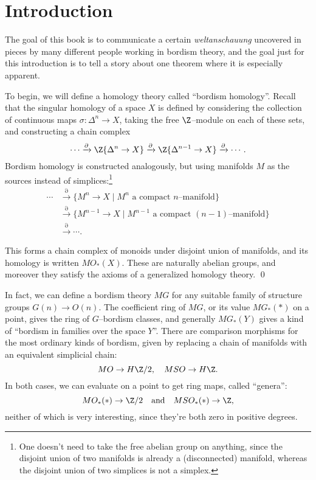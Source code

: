 
\setcounter{chapter}{-1}
\chapter{Introduction}

\label{IntroductionSection}

The goal of this book is to communicate a certain \textit{weltanschauung} uncovered in pieces by many different people working in bordism theory, and the goal just for this introduction is to tell a story about one theorem where it is especially apparent.

To begin, we will define a homology theory called ``bordism homology''.  Recall that the singular homology of a space $X$ is defined by considering the collection of continuous maps $\sigma: \Delta^n \to X$, taking the free $\Z$--module on each of these sets, and constructing a chain complex \[\cdots \xrightarrow{\partial} \Z\{\Delta^n \to X\} \xrightarrow{\partial} \Z\{\Delta^{n-1} \to X\} \xrightarrow{\partial} \cdots.\]  Bordism homology is constructed analogously, but using manifolds $M$ as the sources instead of simplices:\footnote{One doesn't need to take the free abelian group on anything, since the disjoint union of two manifolds is already a (disconnected) manifold, whereas the disjoint union of two simplices is not a simplex.}
\begin{align*}
\cdots & \xrightarrow{\partial} \{M^n \to X \mid \text{$M^n$ a compact $n$--manifold}\} \\
& \xrightarrow{\partial} \{M^{n-1} \to X \mid \text{$M^{n-1}$ a compact $(n-1)$--manifold}\} \\
& \xrightarrow{\partial} \cdots.
\end{align*}

\begin{lemma}
This forms a chain complex of monoids under disjoint union of manifolds, and its homology is written $MO_*(X)$.  These are naturally abelian groups, and moreover they satisfy the axioms of a generalized homology theory. \qed
\end{lemma}

In fact, we can define a bordism theory $MG$ for any suitable family of structure groups $G(n) \to O(n)$.  The coefficient ring of $MG$, or its value $MG_*(*)$ on a point, gives the ring of $G$--bordism classes, and generally $MG_*(Y)$ gives a kind of ``bordism in families over the space $Y$''.  There are comparison morphisms for the most ordinary kinds of bordism, given by replacing a chain of manifolds with an equivalent simplicial chain: \[MO \to H\Z/2, \quad MSO \to H\Z.\] In both cases, we can evaluate on a point to get ring maps, called ``genera'': \[MO_*(*) \to \Z/2 \quad \text{and} \quad MSO_*(*) \to \Z,\] neither of which is very interesting, since they're both zero in positive degrees.

